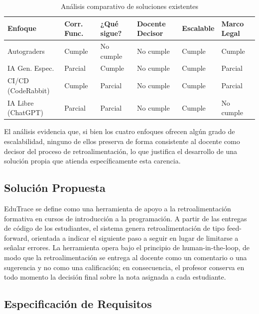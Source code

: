 \documentclass[letterpaper, 10 pt, conference]{ieeeconf}
\begin{document}
\begin{table}[ht]
	\centering
	\caption{Análisis comparativo de soluciones existentes}
	\label{tab:comparativo}
	\footnotesize %
	\setlength{\tabcolsep}{2pt} %
	\begin{tabular}{lp{0.9cm}p{0.9cm}p{1.1cm}p{1.15cm}p{0.9cm}}
		\hline
		\textbf{Enfoque} & \textbf{Corr. Func.} & \textbf{¿Qué sigue?} & \textbf{Docente Decisor} & \textbf{Escalable} & \textbf{Marco Legal} \\
		\hline
		Autograders & Cumple & No cumple & No cumple & Cumple & Cumple \\
		IA Gen. Espec. & Parcial & Cumple & No cumple & Cumple & Parcial \\
		CI/CD (CodeRabbit) & Cumple & Parcial & No cumple & Cumple & Parcial \\
		IA Libre (ChatGPT) & Parcial & Parcial & No cumple & Cumple & No cumple \\
		\hline
	\end{tabular}
\end{table}

El análisis evidencia que, si bien los cuatro enfoques ofrecen algún grado de escalabilidad, ninguno de ellos preserva de forma consistente al docente como decisor del proceso de retroalimentación, lo que justifica el desarrollo de una solución propia que atienda específicamente esta carencia.

\subsection{Solución Propuesta}
EduTrace se define como una herramienta de apoyo a la retroalimentación formativa en cursos de introducción a la programación. A partir de las entregas de código de los estudiantes, el sistema genera retroalimentación de tipo feed-forward, orientada a indicar el siguiente paso a seguir en lugar de limitarse a señalar errores. La herramienta opera bajo el principio de human-in-the-loop, de modo que la retroalimentación se entrega al docente como un comentario o una sugerencia y no como una calificación; en consecuencia, el profesor conserva en todo momento la decisión final sobre la nota asignada a cada estudiante.

\subsection{Especificación de Requisitos}
\end{document}
